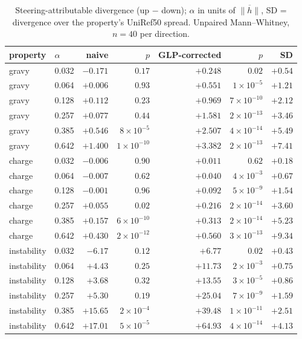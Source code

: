 \documentclass{article}
\begin{document}
\begin{table}[htbp]
\centering
\caption{Steering-attributable divergence (up $-$ down); $\alpha$ in units of $\overline{\lVert h\rVert}$, SD = divergence over the property's UniRef50 spread. Unpaired Mann--Whitney, $n{=}40$ per direction.}
\label{tab:steer-efficacy}
\begin{tabular}{llrrrrr}
\toprule
property & $\alpha$ & naive & $p$ & GLP-corrected & $p$ & SD \\
\midrule
gravy & 0.032 & $-0.171$ & $0.17$ & $+0.248$ & $0.02$ & $+0.54$ \\
gravy & 0.064 & $+0.006$ & $0.93$ & $+0.551$ & $1{\times}10^{-5}$ & $+1.21$ \\
gravy & 0.128 & $+0.112$ & $0.23$ & $+0.969$ & $7{\times}10^{-10}$ & $+2.12$ \\
gravy & 0.257 & $+0.077$ & $0.44$ & $+1.581$ & $2{\times}10^{-13}$ & $+3.46$ \\
gravy & 0.385 & $+0.546$ & $8{\times}10^{-5}$ & $+2.507$ & $4{\times}10^{-14}$ & $+5.49$ \\
gravy & 0.642 & $+1.400$ & $1{\times}10^{-10}$ & $+3.382$ & $2{\times}10^{-13}$ & $+7.41$ \\
\addlinespace
charge & 0.032 & $-0.006$ & $0.90$ & $+0.011$ & $0.62$ & $+0.18$ \\
charge & 0.064 & $-0.007$ & $0.62$ & $+0.040$ & $4{\times}10^{-3}$ & $+0.67$ \\
charge & 0.128 & $-0.001$ & $0.96$ & $+0.092$ & $5{\times}10^{-9}$ & $+1.54$ \\
charge & 0.257 & $+0.055$ & $0.02$ & $+0.216$ & $2{\times}10^{-14}$ & $+3.60$ \\
charge & 0.385 & $+0.157$ & $6{\times}10^{-10}$ & $+0.313$ & $2{\times}10^{-14}$ & $+5.23$ \\
charge & 0.642 & $+0.430$ & $2{\times}10^{-12}$ & $+0.560$ & $3{\times}10^{-13}$ & $+9.34$ \\
\addlinespace
instability & 0.032 & $-6.17$ & $0.12$ & $+6.77$ & $0.02$ & $+0.43$ \\
instability & 0.064 & $+4.43$ & $0.25$ & $+11.73$ & $2{\times}10^{-3}$ & $+0.75$ \\
instability & 0.128 & $+3.68$ & $0.32$ & $+13.55$ & $3{\times}10^{-5}$ & $+0.86$ \\
instability & 0.257 & $+5.30$ & $0.19$ & $+25.04$ & $7{\times}10^{-9}$ & $+1.59$ \\
instability & 0.385 & $+15.65$ & $2{\times}10^{-4}$ & $+39.48$ & $1{\times}10^{-11}$ & $+2.51$ \\
instability & 0.642 & $+17.01$ & $5{\times}10^{-5}$ & $+64.93$ & $4{\times}10^{-14}$ & $+4.13$ \\
\bottomrule
\end{tabular}
\end{table}
\end{document}
